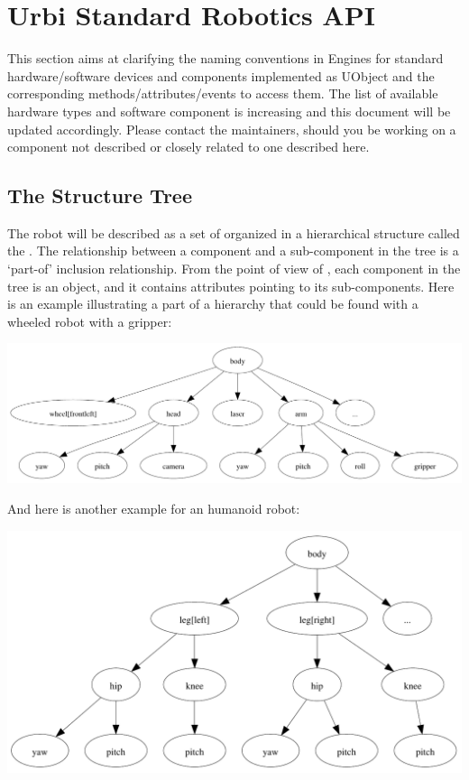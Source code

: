 
\chapter{Urbi Standard Robotics API}
\label{sec:naming}


This section aims at clarifying the naming conventions in \urbi Engines for
standard hardware/software devices and components implemented as UObject and
the corresponding methods/attributes/events to access them. The list of
available hardware types and software component is increasing and this
document will be updated accordingly. Please contact the maintainers,
should you be working on a component not described or closely related to one
described here.

\section{The Structure Tree}

The robot will be described as a set of  organized in a
hierarchical structure called the . The relationship
between a component and a sub-component in the tree is a `part-of' inclusion
relationship. From the point of view of \urbi, each component in the tree is
an object, and it contains attributes pointing to its sub-components. Here
is an example illustrating a part of a hierarchy that could be found with a
wheeled robot with a gripper:

\begin{center}
  \includegraphics[width=.8\linewidth]{img/structure-tree-wheeled}
\end{center}

And here is another example for an humanoid robot:

\begin{center}
  \includegraphics[width=.8\linewidth]{img/structure-tree-humanoid}
\end{center}

